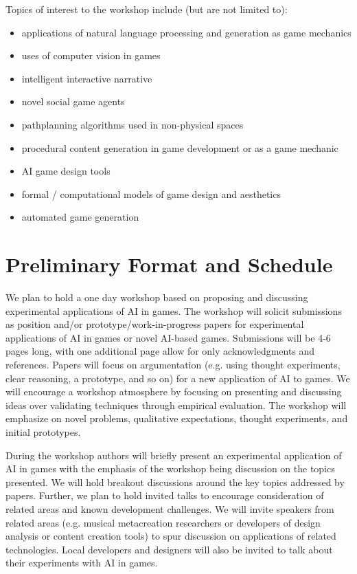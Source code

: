 \documentclass[10pt,a4paper]{article}
\begin{document}
Topics of interest to the workshop include (but are not limited to): 
\begin{itemize}
\itemsep0em
\item applications of natural language processing and generation as game mechanics
\item uses of computer vision in games
\item intelligent interactive narrative
\item novel social game agents
\item pathplanning algorithms used in non-physical spaces
\item procedural content generation in game development or as a game mechanic
\item AI game design tools
\item formal / computational models of game design and aesthetics
\item automated game generation
\end{itemize}

\section{Preliminary Format and Schedule}

We plan to hold a one day workshop based on proposing and discussing experimental applications of AI in games.
The workshop will solicit submissions as position and/or prototype/work-in-progress papers for experimental applications of AI in games or novel AI-based games.
Submissions will be 4-6 pages long, with one additional page allow for only acknowledgments and references.
Papers will focus on argumentation (e.g. using thought experiments, clear reasoning, a prototype, and so on) for a new application of AI to games.
We will encourage a workshop atmosphere by focusing on presenting and discussing ideas over validating techniques through empirical evaluation. 
The workshop will emphasize on novel problems, qualitative expectations, thought experiments, and initial prototypes.

During the workshop authors will briefly present an experimental application of AI in games with the emphasis of the workshop being discussion on the topics presented.
We will hold breakout discussions around the key topics addressed by papers.
Further, we plan to hold invited talks to encourage consideration of related areas and known development challenges.
We will invite speakers from related areas (e.g. musical metacreation researchers or developers of design analysis or content creation tools) to spur discussion on applications of related technologies.
Local developers and designers will also be invited to talk about their experiments with AI in games.
\end{document}
